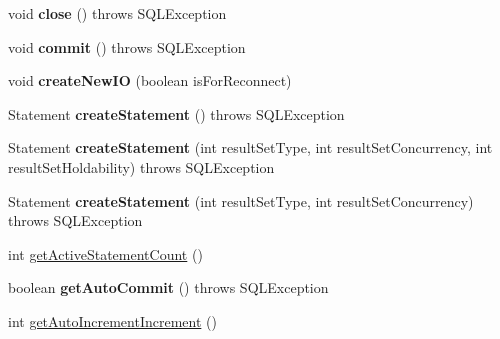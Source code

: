 \begin{DoxyCompactItemize}
void {\bfseries close} ()  throws S\+Q\+L\+Exception 
\item 
\mbox{\label{classcom_1_1mysql_1_1cj_1_1jdbc_1_1ha_1_1_multi_host_my_s_q_l_connection_a789df6249664b46fe3142bc4d981b046}} 
void {\bfseries commit} ()  throws S\+Q\+L\+Exception 
\item 
\mbox{\label{classcom_1_1mysql_1_1cj_1_1jdbc_1_1ha_1_1_multi_host_my_s_q_l_connection_a82a97ebf4275bab6b1a25ef00985185d}} 
void {\bfseries create\+New\+IO} (boolean is\+For\+Reconnect)
\item 
\mbox{\label{classcom_1_1mysql_1_1cj_1_1jdbc_1_1ha_1_1_multi_host_my_s_q_l_connection_a92d29e789b428734a8ea9232b0e45092}} 
Statement {\bfseries create\+Statement} ()  throws S\+Q\+L\+Exception 
\item 
\mbox{\label{classcom_1_1mysql_1_1cj_1_1jdbc_1_1ha_1_1_multi_host_my_s_q_l_connection_a09c85146032934aa5ee3ebfaa48ffd5c}} 
Statement {\bfseries create\+Statement} (int result\+Set\+Type, int result\+Set\+Concurrency, int result\+Set\+Holdability)  throws S\+Q\+L\+Exception 
\item 
\mbox{\label{classcom_1_1mysql_1_1cj_1_1jdbc_1_1ha_1_1_multi_host_my_s_q_l_connection_affad789183eb149d3b219bc1cb27fc76}} 
Statement {\bfseries create\+Statement} (int result\+Set\+Type, int result\+Set\+Concurrency)  throws S\+Q\+L\+Exception 
\item 
int \mbox{\hyperlink{classcom_1_1mysql_1_1cj_1_1jdbc_1_1ha_1_1_multi_host_my_s_q_l_connection_a5f85b0597c870954959bd5c2a48ae28b}{get\+Active\+Statement\+Count}} ()
\item 
\mbox{\label{classcom_1_1mysql_1_1cj_1_1jdbc_1_1ha_1_1_multi_host_my_s_q_l_connection_a6b62ddd7ccef987f5f94910e5cdd7d96}} 
boolean {\bfseries get\+Auto\+Commit} ()  throws S\+Q\+L\+Exception 
\item 
int \mbox{\hyperlink{classcom_1_1mysql_1_1cj_1_1jdbc_1_1ha_1_1_multi_host_my_s_q_l_connection_a94d28c91c18c2c57cd4ec7855a3d061d}{get\+Auto\+Increment\+Increment}} ()

\end{DoxyCompactItemize}
